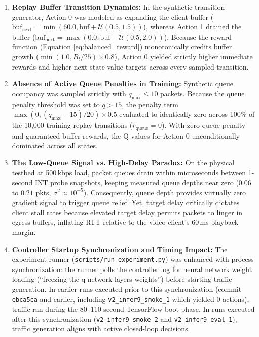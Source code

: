 \documentclass[12pt,a4paper,oneside]{report}
\begin{document}
\begin{enumerate}[label=\arabic*.]
  \item \textbf{Replay Buffer Transition Dynamics:} In the synthetic transition generator, Action 0 was modeled as expanding the client buffer ($\text{buf}_{\text{next}} = \min(60.0, \text{buf} + \mathcal{U}(0.5, 1.5))$), whereas Action 1 drained the buffer ($\text{buf}_{\text{next}} = \max(0.0, \text{buf} - \mathcal{U}(0.5, 2.0))$). Because the reward function (Equation \ref{eq:balanced_reward}) monotonically credits buffer growth ($\min(1.0, B_t/25) \times 0.8$), Action 0 yielded strictly higher immediate rewards and higher next-state value targets across every sampled transition.
  \item \textbf{Absence of Active Queue Penalties in Training:} Synthetic queue occupancy was sampled strictly with $q_{\max} \le 10$ packets. Because the queue penalty threshold was set to $q > 15$, the penalty term $\max(0, (q_{\max} - 15)/20) \times 0.5$ evaluated to identically zero across 100\% of the 10,000 training replay transitions ($r_{\text{queue}} = 0$). With zero queue penalty and guaranteed buffer rewards, the Q-values for Action 0 unconditionally dominated across all states.
  \item \textbf{The Low-Queue Signal vs. High-Delay Paradox:} On the physical testbed at 500\,kbps load, packet queues drain within microseconds between 1-second INT probe snapshots, keeping measured queue depths near zero ($0.06$ to $0.21$ pkts, $\sigma^2 \approx 10^{-5}$). Consequently, queue depth provides virtually zero gradient signal to trigger queue relief. Yet, target delay critically dictates client stall rates because elevated target delay permits packets to linger in egress buffers, inflating RTT relative to the video client's 60\,ms playback margin.
  \item \textbf{Controller Startup Synchronization and Timing Impact:} The experiment runner (\texttt{scripts/run\_experiment.py}) was enhanced with process synchronization: the runner polls the controller log for neural network weight loading (``freezing the q-network layers weights'') before starting traffic generation. In earlier runs executed prior to this synchronization (commit \texttt{ebca5ca} and earlier, including \texttt{v2\_infer9\_smoke\_1} which yielded 0 actions), traffic ran during the 80--110 second TensorFlow boot phase. In runs executed after this synchronization (\texttt{v2\_infer9\_smoke\_2} and \texttt{v2\_infer9\_eval\_1}), traffic generation aligns with active closed-loop decisions.
\end{enumerate}
\end{document}
